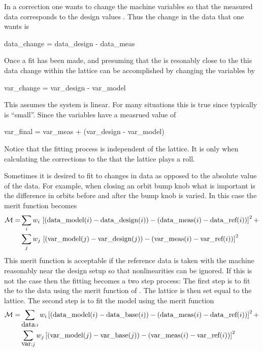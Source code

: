 In a correction one wants to change the machine variables so that the
measured data corresponds to the design values . Thus
the change in the data that one wants is
\begin{example}
  data_change = data_design - data_meas
\end{example}
Once a fit has been made, and presuming that the  is
resonably close to the  this data change within the
 lattice can be accomplished by changing the variables by
\begin{example}
  var_change = var_design - var_model
\end{example}
This assumes the system is linear. For many situations this is true
since typically  is ``small''. Since the variables have a measrued value of 


\begin{example}
  var_final = var_meas + (var_design - var_model)
\end{example}
Notice that the fitting process is independent of the 
lattice. It is only when calculating the corrections to the
 that the  lattice plays a roll. 

Sometimes it is desired to fit to changes in data as opposed to the
absolute value of the data. For example, when closing an orbit bump
knob what is important is the difference in orbits before and
after the bump knob is varied. In this case the merit function becomes
\begin{alignat}{1}
  {\cal M} = &\sum_{i} w_i \,
    \left[ ({\mbox{data}}\_{\mbox{model}}(i) - {\mbox{data}}\_{\mbox{design}}(i)) - 
      ({\mbox{data}}\_{\mbox{meas}}(i) - {\mbox{data}}\_{\mbox{ref}}(i)) \right]^2 + \nonumber \\
  &\sum_{j} w_j \,
    \left[ ({\mbox{var}}\_{\mbox{model}}(j) - {\mbox{var}}\_{\mbox{design}}(j)) -
     ({\mbox{var}}\_{\mbox{meas}}(i) - {\mbox{var}}\_{\mbox{ref}}(i)) \right]^2 
  \label{m2}
\end{alignat}
This merit function is acceptable if the reference data is taken with
the machine reasonably near the design setup so that nonlinearities
can be ignored. If this is not the case then the fitting becomes a two
step process: The first step is to fit the  to the 
data using the merit function of . The  lattice is then
set equal to the  lattice. The second
step is to fit the model using the merit function
\begin{alignat}{1}
  {\cal M} = &\sum_{{\mbox{data}}: i} w_i 
    \left[ ({\mbox{data}}\_{\mbox{model}}(i) - {\mbox{data}}\_{\mbox{base}}(i)) - 
      ({\mbox{data}}\_{\mbox{meas}}(i) - {\mbox{data}}\_{\mbox{ref}}(i)) \right]^2 + \nonumber \\
  &\sum_{{\mbox{var}}: j} w_j 
    \left[ ({\mbox{var}}\_{\mbox{model}}(j) - {\mbox{var}}\_{\mbox{base}}(j)) -
     ({\mbox{var}}\_{\mbox{meas}}(i) - {\mbox{var}}\_{\mbox{ref}}(i)) \right]^2 
  \label{m3}
\end{alignat}

